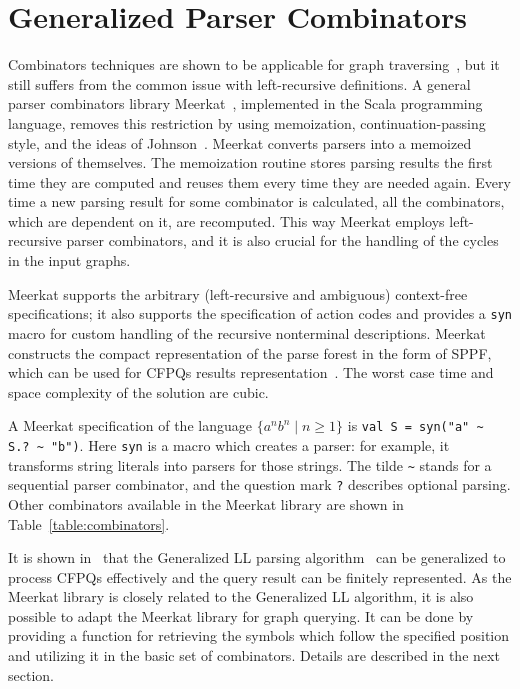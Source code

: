 \section{Generalized Parser Combinators}
\label{sec:GLL}

Combinators techniques are shown to be applicable for graph traversing~\cite{ScalaGraphParsing}, but it still suffers from the common issue with left-recursive definitions.
A general parser combinators library Meerkat~\cite{Meerkat}, implemented in the Scala programming language, removes this restriction by using memoization, continuation-passing style, and the ideas of Johnson~\cite{Johnson}.
Meerkat converts parsers into a memoized versions of themselves.
The memoization routine stores parsing results the first time they are computed and reuses them every time they are needed again.
Every time a new parsing result for some combinator is calculated, all the combinators, which are dependent on it, are recomputed.
This way Meerkat employs left-recursive parser combinators, and it is also crucial for the handling of the cycles in the input graphs.

Meerkat supports the arbitrary (left-recursive and ambiguous) context-free specifications; it also supports the specification of action codes and provides a \lstinline{syn} macro for custom handling of the recursive nonterminal descriptions.
Meerkat constructs the compact representation of the parse forest in the form of SPPF, which can be used for CFPQs results representation~\cite{GrigorevR16}.
The worst case time and space complexity of the solution are cubic.

A Meerkat specification of the language $\{a^n b^n \mid n \geq 1\}$ is \lstinline{val S = syn("a" ~ S.? ~ "b")}. Here \lstinline{syn} is a macro which creates a parser: for example, it transforms string literals into parsers for those strings. The tilde \lstinline{~} stands for a sequential parser combinator, and the question mark \lstinline{?} describes optional parsing. Other combinators available in the Meerkat library are shown in Table~\ref{table:combinators}.

It is shown in~\cite{GrigorevR16} that the Generalized LL parsing algorithm~\cite{scott2010gll} can be generalized to process CFPQs effectively and the query result can be finitely represented.
As the Meerkat library is closely related to the Generalized LL algorithm, it is also possible to adapt the Meerkat library for graph querying.
It can be done by providing a function for retrieving the symbols which follow the specified position and utilizing it in the basic set of combinators.
Details are described in the next section.

